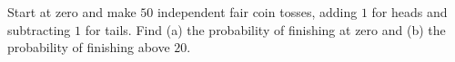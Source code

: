 Start at zero and make $50$ independent fair coin tosses, adding $1$ for heads and subtracting $1$ for tails. Find (a) the probability of finishing at zero and (b) the probability of finishing above $20$.
